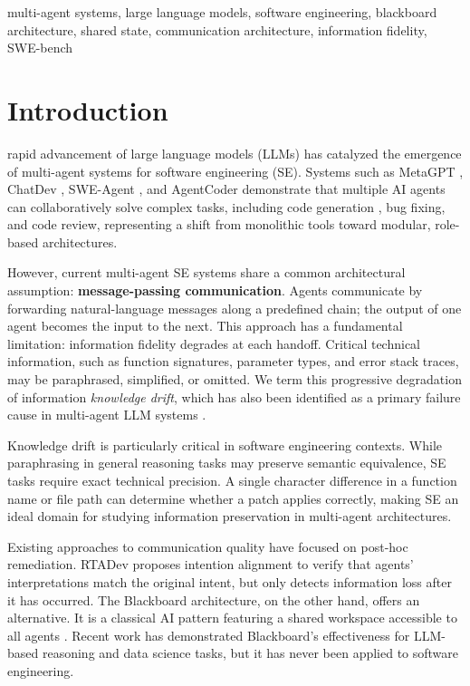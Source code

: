 \documentclass{ieeeaccess}
\begin{document}
\begin{keywords}
multi-agent systems, large language models, software engineering, blackboard architecture, shared state, communication architecture, information fidelity, SWE-bench
\end{keywords}

\titlepgskip=-21pt

\maketitle

\section{Introduction}

 rapid advancement of large language models (LLMs) \cite{brown2020language} has catalyzed the emergence of multi-agent systems for software engineering (SE). Systems such as MetaGPT \cite{hong2024metagpt}, ChatDev \cite{qian2024chatdev}, SWE-Agent \cite{yang2024sweagent}, and AgentCoder \cite{huang2024agentcoder} demonstrate that multiple AI agents can collaboratively solve complex tasks, including code generation \cite{chen2021evaluating}, bug fixing, and code review, representing a shift from monolithic tools toward modular, role-based architectures.

However, current multi-agent SE systems share a common architectural assumption: \textbf{message-passing communication}. Agents communicate by forwarding natural-language messages along a predefined chain; the output of one agent becomes the input to the next. This approach has a fundamental limitation: information fidelity degrades at each handoff. Critical technical information, such as function signatures, parameter types, and error stack traces, may be paraphrased, simplified, or omitted. We term this progressive degradation of information \emph{knowledge drift}, which has also been identified as a primary failure cause in multi-agent LLM systems \cite{cemri2025why}.

Knowledge drift is particularly critical in software engineering contexts. While paraphrasing in general reasoning tasks may preserve semantic equivalence, SE tasks require exact technical precision. A single character difference in a function name or file path can determine whether a patch applies correctly, making SE an ideal domain for studying information preservation in multi-agent architectures.

Existing approaches to communication quality have focused on post-hoc remediation. RTADev \cite{fang2025rtadev} proposes intention alignment to verify that agents' interpretations match the original intent, but only detects information loss after it has occurred. The Blackboard architecture, on the other hand, offers an alternative. It is a classical AI pattern featuring a shared workspace accessible to all agents \cite{nii1986blackboard}. Recent work has demonstrated Blackboard's effectiveness for LLM-based reasoning \cite{wang2025lbmas} and data science \cite{salemi2025llm} tasks, but it has never been applied to software engineering.
\end{document}
